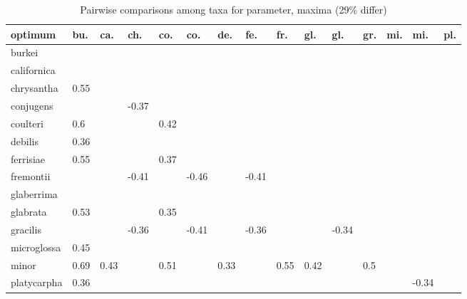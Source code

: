 \begin{table}[ht]
\centering
\caption{Pairwise comparisons among taxa for parameter, maxima (29\% differ)} 
\begin{tabular}{lllllllllllllll}
  \hline
optimum & bu. & ca. & ch. & co. & co. & de. & fe. & fr. & gl. & gl. & gr. & mi. & mi. & pl. \\ 
  \hline
burkei &  &  &  &  &  &  &  &  &  &  &  &  &  &  \\ 
  californica &  &  &  &  &  &  &  &  &  &  &  &  &  &  \\ 
  chrysantha & 0.55 &  &  &  &  &  &  &  &  &  &  &  &  &  \\ 
  conjugens &  &  & -0.37 &  &  &  &  &  &  &  &  &  &  &  \\ 
  coulteri & 0.6 &  &  & 0.42 &  &  &  &  &  &  &  &  &  &  \\ 
  debilis & 0.36 &  &  &  &  &  &  &  &  &  &  &  &  &  \\ 
  ferrisiae & 0.55 &  &  & 0.37 &  &  &  &  &  &  &  &  &  &  \\ 
  fremontii &  &  & -0.41 &  & -0.46 &  & -0.41 &  &  &  &  &  &  &  \\ 
  glaberrima &  &  &  &  &  &  &  &  &  &  &  &  &  &  \\ 
  glabrata & 0.53 &  &  & 0.35 &  &  &  &  &  &  &  &  &  &  \\ 
  gracilis &  &  & -0.36 &  & -0.41 &  & -0.36 &  &  & -0.34 &  &  &  &  \\ 
  microglossa & 0.45 &  &  &  &  &  &  &  &  &  &  &  &  &  \\ 
  minor & 0.69 & 0.43 &  & 0.51 &  & 0.33 &  & 0.55 & 0.42 &  & 0.5 &  &  &  \\ 
  platycarpha & 0.36 &  &  &  &  &  &  &  &  &  &  &  & -0.34 &  \\ 
   \hline
\end{tabular}
\end{table}
